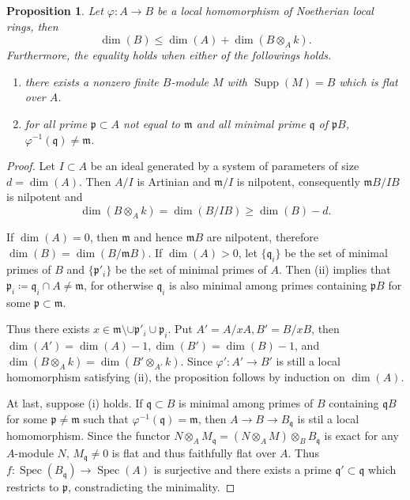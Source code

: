 \documentclass[leqno]{amsart}
\DeclareMathOperator{\Supp}{Supp}
\DeclareMathOperator{\Spec}{Spec}
\newcommand{\1}{\mathbf{1}}
\newcommand{\fm}{\mathfrak m}
\newcommand{\fp}{\mathfrak p}
\newcommand{\fq}{\mathfrak q}
\newtheorem{prop}[thm]{Proposition}
\theoremstyle{definition}
\theoremstyle{remark}
\begin{document}
\begin{prop}
    Let $\varphi\colon A\to B$ be a local homomorphism
    of Noetherian local rings, then
    \[
        \dim(B)\leq \dim(A)+\dim(B\otimes_Ak).
    \]
    Furthermore, the equality holds 
    when either of the followings holds.
    \begin{enumerate}[label=(\roman*)]
        \item there exists a nonzero finite $B$-module $M$ 
	with $\Supp(M)=B$ which is flat over $A$.
        \item for all prime $\fp\subset A$ not equal to $\fm$ 
	and all minimal prime $\fq$ of $\fp B$, 
	$\varphi^{-1}(\fq)\neq \fm$.
    \end{enumerate}
\end{prop}
\begin{proof}
	Let $I\subset A$ be an ideal generated
	by a system of parameters of size  $d=\dim(A)$.
	Then $A/I$ is Artinian and $\fm/I$ is nilpotent,
	consequently $\fm B/IB$ is nilpotent and 
	\[
		\dim(B\otimes_Ak)=\dim(B/IB)\geq \dim(B)-d.
	\]
	
	If $\dim(A)=0$, then  $\fm$ and hence $\fm B$
	are nilpotent, therefore $\dim(B)=\dim(B/\fm B)$.
	If $\dim(A)>0$,
	let  $\{\fq_i\}$ be the set of minimal primes of $B$ and
	$\{\fp'_i\}$ be the set of minimal primes of $A$.
	Then (ii) implies that
	$\fp_i\coloneqq \fq_i\cap A\neq \fm$,
	for otherwise $\fq_i$ is also minimal 
	among primes containing  $\fp B$ for some $\fp\subset \fm$.

	Thus there exists $x\in \fm\setminus \cup\fp'_i\cup\fp_i$.
	Put $A'=A/xA, B'=B/xB$,
	then $\dim(A')=\dim(A)-1,\dim(B')=\dim(B)-1$,
	and $\dim(B\otimes_Ak)=\dim(B'\otimes_{A'}k)$.
	Since $\varphi'\colon A'\to B'$
	is still a local homomorphism satisfying (ii),
	the proposition follows by induction on  $\dim(A)$.

	At last, suppose (i) holds.
	If  $\fq\subset B$ is minimal among primes of $B$
	containing  $\fq B$ for some  $\fp\neq \fm$
	such that $\varphi^{-1}(\fq)=\fm$,
	then  $A\to B\to B_\fq$ is stil a local homomorphism.
	Since the functor 
	$N\otimes_AM_\fq=(N\otimes_AM)\otimes_BB_\fq$
	is exact for any  $A$-module $N$,
	$M_\fq\neq 0$ is flat and thus faithfully flat over $A$.
	Thus $f\colon \Spec(B_\fq)\to \Spec(A)$
	is surjective and there exists a prime $\fq'\subset \fq$ 
	which restricts to $\fp$, constradicting the minimality.
\end{proof}



\end{document}
